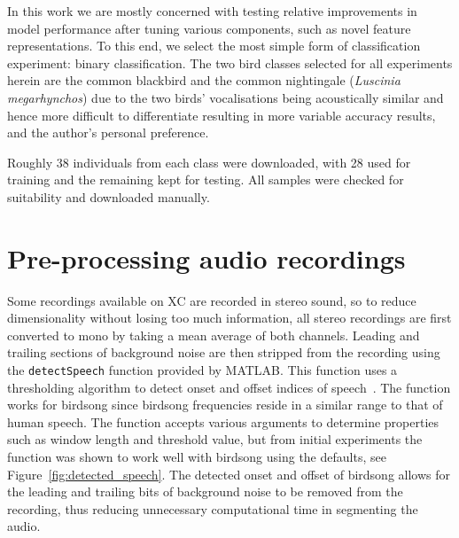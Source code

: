 In this work we are mostly concerned with testing relative improvements in model
performance after tuning various components, such as novel feature
representations. To this end, we select the most simple form of classification
experiment: binary classification. The two bird classes selected for all
experiments herein are the common blackbird and the common nightingale
(\textit{Luscinia megarhynchos}) due to the two birds' vocalisations being
acoustically similar and hence more difficult to differentiate resulting in more
variable accuracy results, and the author's personal preference.

Roughly 38 individuals from each class were downloaded, with 28 used for
training and the remaining kept for testing. All samples were checked for
suitability and downloaded manually.

\section{Pre-processing audio recordings}

Some recordings available on XC are recorded in stereo sound, so to
reduce dimensionality without losing too much information, all stereo recordings
are first converted to mono by taking a mean average of both channels. Leading
and trailing sections of background noise are then stripped from the recording
using the \texttt{detectSpeech} function provided by MATLAB\@. This
function uses a thresholding algorithm to detect onset and offset indices of
speech~\cite{giannakopoulos2009method}. The function works for birdsong since
birdsong frequencies reside in a similar range to that of human speech. The
function accepts various arguments to determine properties such as window length
and threshold value, but from initial experiments the function was shown to
work well with birdsong using the defaults, see Figure~\ref{fig:detected_speech}.
The detected onset and offset of birdsong allows for the leading and trailing
bits of background noise to be removed from the recording, thus reducing
unnecessary computational time in segmenting the audio.

